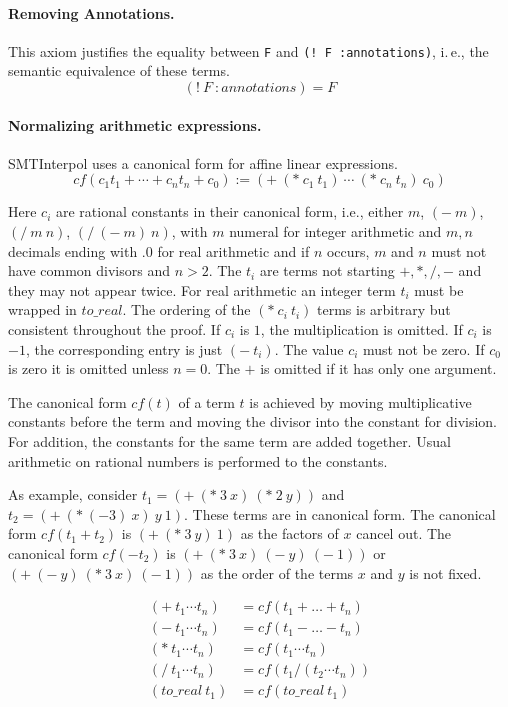 \documentclass[a4paper]{article}
\newcommand\si{SMTInterpol\xspace}
\newcommand\cf{\mathit{cf}}
\begin{document}
\paragraph{Removing Annotations.}  This axiom justifies the equality
between \verb+F+ and \verb+(! F :annotations)+, i.\,e., the semantic
equivalence of these terms.
\begin{equation}
  (!\ F\ :\!annotations) = F
  \tag{strip}
\end{equation}

\paragraph{Normalizing arithmetic expressions.}
\si uses a canonical form for affine linear expressions.
\[
\cf(c_1t_1 + \cdots + c_nt_n + c_0) := (+\ (*\ c_1\ t_1)\ \cdots\ (*\ c_n\ t_n)\ c_0)
\]

Here $c_i$ are rational constants in their canonical form, i.e.,
either $m$, $(-\ m)$, $(/\ m\ n)$, $(/\ (-\ m)\ n)$, with $m$ numeral
for integer arithmetic and $m,n$ decimals ending with $.0$ for real
arithmetic and if $n$ occurs, $m$ and $n$ must not have common
divisors and $n > 2$. The $t_i$ are terms not starting $+,*,/,-$ and
they may not appear twice.  For real arithmetic an integer term $t_i$
must be wrapped in $to\_real$.  The ordering of the $(*\ c_i\ t_i)$
terms is arbitrary but consistent throughout the proof.  If $c_i$ is
$1$, the multiplication is omitted.  If $c_i$ is $-1$, the
corresponding entry is just $(-\ t_i)$.  The value $c_i$ must not be
zero.  If $c_0$ is zero it is omitted unless $n=0$.  The $+$ is
omitted if it has only one argument.

The canonical form $\cf(t)$ of a term $t$ is achieved by moving
multiplicative constants before the term and moving the divisor into
the constant for division.  For addition, the constants for the same
term are added together.  Usual arithmetic on rational numbers is
performed to the constants.

As example, consider $t_1 = (+\ (*\ 3\ x)\ (*\ 2\ y))$ and $t_2 =
(+\ (*\ (- 3)\ x)\ y\ 1)$.  These terms are in canonical form. The
canonical form $\cf(t_1+t_2)$ is $(+\ (*\ 3\ y)\ 1)$ as the factors of
$x$ cancel out.  The canonical form $\cf(-t_2)$ is
$(+\ (*\ 3\ x)\ (-\ y)\ (-\ 1))$ or $(+\ (-\ y)\ (*\ 3\ x)\ (-\ 1))$
as the order of the terms $x$ and $y$ is not fixed.


\begin{equation}
  \begin{aligned}
  (+\ t_1 \cdots t_n) &= \cf(t_1+\dots+t_n)\\
  (-\ t_1 \cdots t_n) &= \cf(t_1-\dots-t_n)\\
  (*\ t_1 \cdots t_n) &= \cf(t_1 \cdots t_n)\\
  (/\ t_1 \cdots t_n) &= \cf(t_1 / (t_2\cdots t_n))\\
  (to\_real\ t_1) &= \cf(to\_real\ t_1)
  \end{aligned}
  \tag{canonicalSum}
\end{equation}
\end{document}
